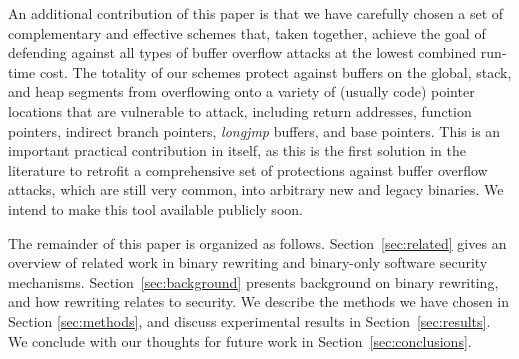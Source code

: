 An additional contribution of this paper is that we have carefully
chosen a set of complementary and effective schemes that, taken
together, achieve the goal of defending against all types of buffer
overflow attacks at the lowest combined run-time cost.  The totality
of our schemes protect against buffers on the global, stack, and heap
segments from overflowing onto a variety of (usually code) pointer
locations that are vulnerable to attack, including return
addresses, function pointers, indirect branch pointers, \emph{longjmp}
buffers, and base pointers. This is an important practical
contribution in itself, as this is the first solution in the
literature to retrofit a comprehensive set of protections against
buffer overflow attacks, which are still very common, into arbitrary
new and legacy binaries.  We intend to make this tool available
publicly soon.

The remainder of this paper is organized as
follows. Section~\ref{sec:related} gives an overview of related work
in binary rewriting and binary-only software security
mechanisms. Section~\ref{sec:background} presents background on binary
rewriting, and how rewriting relates to security. We describe the
methods we have chosen in Section \ref{sec:methods}, and discuss
experimental results in Section~\ref{sec:results}. We conclude with
our thoughts for future work in Section~\ref{sec:conclusions}.

